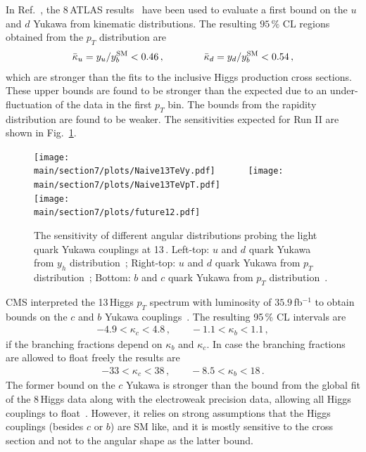 \documentclass[../report.tex]{subfiles}
\providecommand{\main}{..}
\begin{document}
In Ref.~\cite{Soreq:2016rae}, the 8\,\UTeV ATLAS results~\cite{Aad:2015lha} have been used to evaluate a first bound on the $u$ and $d$ Yukawa from kinematic distributions. The resulting $95\,\%$ CL regions obtained from the  $p_T$ distribution are
%
\begin{align}
	\bar{\kappa}_u = y_u/y^{\rm SM}_b < 0.46 \, , \qquad\qquad
	\bar{\kappa}_d = y_d/y^{\rm SM}_b< 0.54 \, ,
\end{align}
%
which are stronger than the fits to the inclusive Higgs production cross sections. 
These upper bounds are found to be stronger than the expected due to an under-fluctuation of the data in the first $p_T$ bin. 
The bounds from the  rapidity distribution are found to be weaker. 
The sensitivities expected for Run II  are shown in Fig.~\ref{fig:HiggsDistFuture}. 
\begin{figure}[t]
\begin{center}
\texttt{[image: \\main/section7/plots/Naive13TeVy.pdf]}~~~~~~
\texttt{[image: \\main/section7/plots/Naive13TeVpT.pdf]}\\
\texttt{[image: \\main/section7/plots/future12.pdf]}
\caption{The sensitivity of  different angular distributions probing the light quark Yukawa couplings at 13\,\UTeV.  
Left-top: $u$ and $d$ quark Yukawa from $y_h$ distribution~\cite{Soreq:2016rae};
Right-top: $u$ and $d$ quark Yukawa from $p_T$ distribution~\cite{Soreq:2016rae}; 
Bottom: $b$ and $c$ quark Yukawa from $p_T$ distribution~\cite{Bishara:2016jga}. 
}
\label{fig:HiggsDistFuture}
\end{center}
\end{figure}

CMS interpreted the 13\,\UTeV Higgs $p_T$ spectrum with luminosity of $35.9\,$fb$^{-1}$ to obtain bounds on the $c$ and $b$ Yukawa couplings~\cite{Sirunyan:2018sgc}. 
The resulting 95\,\% CL intervals are
%
\begin{align}
    -4.9 < \kappa_c <4.8 \, ,  \qquad
    -1.1 < \kappa_b < 1.1 \, ,
\end{align}
if the branching fractions  depend on $\kappa_b$ and $\kappa_c$. In case the branching fractions are allowed to float freely the results are
\begin{align}
    -33 < \kappa_c < 38 \, , \qquad
    -8.5 < \kappa_b < 18 \, .
\end{align}
%
The former bound on the $c$ Yukawa is stronger than the bound from the global fit of the 8\,\UTeV Higgs data along with the electroweak precision data, allowing all Higgs couplings to float~\cite{Perez:2015aoa}. However, it relies on strong assumptions that the Higgs couplings (besides $c$ or $b$) are SM like, and it is mostly sensitive to the cross section and not to the angular shape as the latter bound.
\end{document}
